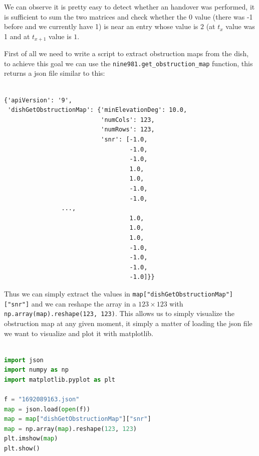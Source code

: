 \documentclass[IN,11pt,twoside,openright,bachelor,english]{tumthesis}
\begin{document}
We can observe it is pretty easy to detect whether an handover was performed, it is sufficient to sum the two matrices and check whether the $0$ value (there was -1 before and we currently have 1) is near an entry whose value is $2$ (at $t_{x}$ value was 1 and at $t_{x+1}$ value is $1$. 



First of all we need to write a script to extract obstruction maps from the dish, to achieve this goal we can use the \texttt{nine981.get\_obstruction\_map} function, this returns a json file similar to this:

\begin{lstlisting}[caption={data from the \texttt{dish\_get\_obstruction\_map} function},captionpos=b]

{'apiVersion': '9',
 'dishGetObstructionMap': {'minElevationDeg': 10.0,
                           'numCols': 123,
                           'numRows': 123,
                           'snr': [-1.0,
                                   -1.0,
                                   -1.0,
                                   1.0,
                                   1.0,
                                   -1.0,
                                   -1.0,
				...,
                                   1.0,
                                   1.0,
                                   1.0,
                                   -1.0,
                                   -1.0,
                                   -1.0,
                                   -1.0]}}  
\end{lstlisting}

Thus we can simply extract the values in \texttt{map["dishGetObstructionMap"]["snr"]} and we can reshape the array in a $123\times123$ with \texttt{np.array(map).reshape(123, 123)}. This allows us to simply visualize the obstruction map at any given moment, it simply a matter of loading the json file we want to visualize and plot it with matplotlib.

\begin{lstlisting}[language=python,caption={visualizing a single obstruction map},captionpos=b]

import json
import numpy as np
import matplotlib.pyplot as plt

f = "1692089163.json"
map = json.load(open(f))
map = map["dishGetObstructionMap"]["snr"]
map = np.array(map).reshape(123, 123)
plt.imshow(map)
plt.show()
\end{lstlisting}
\end{document}
